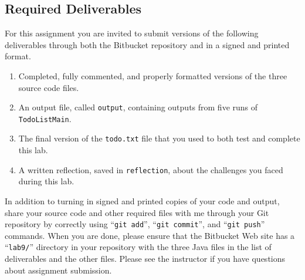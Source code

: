 
\vspace{-0.3in}
\subsection*{Required Deliverables}
\vspace{-0.05in}

For this assignment you are invited to submit versions of the following deliverables through both the Bitbucket
repository and in a signed and printed format.

\vspace{-0.1in}
\begin{enumerate}
    \setlength{\itemsep}{0pt}

  \item Completed, fully commented, and properly formatted versions of the three source code files.
  \item An output file, called {\tt output}, containing outputs from five runs of {\tt TodoListMain}.
  \item The final version of the {\tt todo.txt} file that you used to both test and complete this lab.
  \item A written reflection, saved in {\tt reflection}, about the challenges you faced during this lab.
        
\end{enumerate}
\vspace{-0.1in}

In addition to turning in signed and printed copies of your code and output, share your source code and other required
files with me through your Git repository by correctly using ``{\tt git add}'', ``{\tt git commit}'', and ``{\tt git
  push}'' commands. When you are done, please ensure that the Bitbucket Web site has a ``{\tt lab9/}'' directory in your
repository with the three Java files in the list of deliverables and the other files. Please see the instructor if
you have questions about assignment submission.


